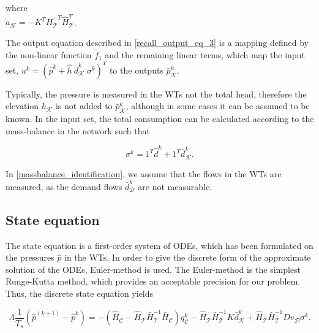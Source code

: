 \vspace{-1mm}

\begin{minipage}[t]{0.4\textwidth}
where\\
\hspace*{8mm} $\tilde{a}_{\mathcal{K}} = - K^T\bar{H}^{-T}_{\mathcal{T}}\hat{H}^{T}_{\mathcal{T}} $. 
\end{minipage}

The output equation described in \eqref{recall_output_eq_3} is a mapping defined by the non-linear function $\tilde{f}_1$ and the remaining linear terms, which map the input set, $u^{k} = ( \hat{p}^{k}\!+\!\hat{h} \ \bar{d}^{k}_{\mathcal{K}} \ \sigma^{k} )^T$ to the outputs $\bar{p}^{k}_{\mathcal{K}}$. 

Typically, the pressure is measured in the WTs not the total head, therefore the elevation $\bar{h}_{\mathcal{K}}$ is not added to $\bar{p}^{k}_{\mathcal{K}}$, although in some cases it can be assumed to be known. In the input set, the total consumption can be calculated according to the mass-balance in the network such that

\begin{equation}
\label{massbalance_identification}
 \sigma^{k} = 1^T \hat{d}^{k} + 1^T \bar{d}^{k}_{\mathcal{K}}.
\end{equation}

 In \eqref{massbalance_identification}, we assume that the flows in the WTs are measured, as the demand flows $\bar{d}^{k}_{\mathcal{D}} $ are not measurable. 

 \subsection{State equation}
\label{state_eq_identification} 

The state equation is a first-order system of ODEs, which has been formulated on the pressures $\hat{p}$ in the WTs. In order to give the discrete form of the approximate solution of the ODEs, Euler-method is used. The Euler-method is the simplest Runge-Kutta method, which provides an acceptable precision for our problem\cite{chicone2006ordinary}. Thus, the discrete state equation yields

\begin{equation}
  \label{WT_matrixform_final_discrete}
\Lambda \frac{1}{T_s} (\hat{p}^{(k+1)} - \hat{p}^{k})  = - (\hat{H}_{\mathcal{C}} - \hat{H}_{\mathcal{T}} \bar{H}^{-1}_{\mathcal{T}}\bar{H}_{\mathcal{C}})  q^{k}_{\mathcal{C}} - \hat{H}_{\mathcal{T}} \bar{H}^{-1}_{\mathcal{T}} K \bar{d}^{k}_{\mathcal{K}} + \hat{H}_{\mathcal{T}} \bar{H}^{-1}_{\mathcal{T}} D v_{\mathcal{D}} \sigma^{k}.
\end{equation}

